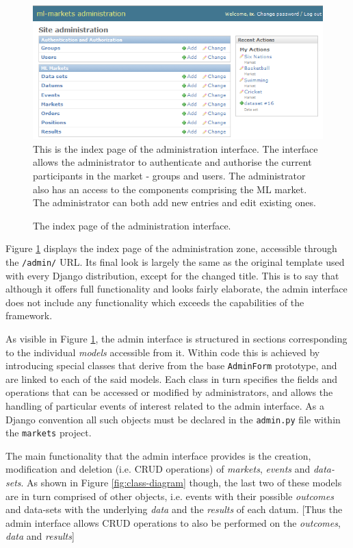 \documentclass[bsc,frontabs,twoside,singlespacing,parskip,deptreport]{infthesis}     %
\begin{document}
\begin{figure}
 \caption{The index page of the administration interface. }
  \includegraphics[width=\textwidth]{figures/admin-index(c).png}
   \label{fig:admin-index}
{This is the index page of the administration interface. The interface allows the administrator to authenticate and authorise the current participants in the market -  groups and users. The administrator also has an access to the components comprising the ML market. The administrator can both add new entries and edit existing ones.}
\end{figure}

	Figure \ref{fig:admin-index} displays the index page of the administration zone, accessible through the {\tt /admin/} URL. Its final look is largely the same as the original template used with every Django distribution, except for the changed title. This is to say that although it offers full functionality and looks fairly elaborate, the admin interface does not include any functionality which exceeds the capabilities of the framework. 

	As visible in Figure \ref{fig:admin-index}, the admin interface is structured in sections corresponding to the individual {\it models} accessible from it. Within code this is achieved by introducing special classes that derive from the base {\tt AdminForm} prototype, and are linked to each of the said models. Each class in turn specifies the fields and operations that can be accessed or modified by administrators, and allows the handling of particular events of interest related to the admin interface. As a Django convention all such objects must be declared in the {\tt admin.py} file within the {\tt markets} project. 

		The main functionality that the admin interface provides is the creation, modification and deletion (i.e. CRUD operations) of {\it markets}, {\it events} and {\it data-sets}. As shown in Figure \ref{fig:class-diagram} though, the last two of these models are in turn comprised of other objects, i.e. events with their possible {\it outcomes} and data-sets with the underlying {\it data} and the {\it results} of each datum. [Thus the admin interface allows CRUD operations to also be performed on the {\it outcomes}, {\it data} and {\it results}]
\end{document}

